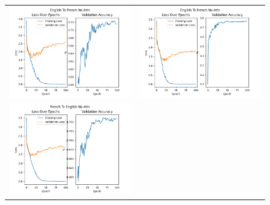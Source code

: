 \documentclass{article}
\begin{document}
\begin{figure}[htb]
    \setlength\tabcolsep{1pt}
    \begin{tabularx}{\textwidth}{XX}
      \includegraphics{plots/en2fr_noattn.png} &
      \includegraphics{plots/en2fr_attn.png} \\
      \includegraphics{plots/fr2en_noattn.png} &

\end{tabularx}
\end{figure}
\end{document}
